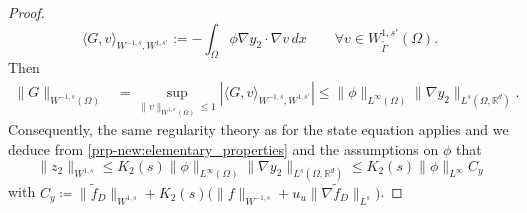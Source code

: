 \documentclass[10pt,a4paper]{amsart}
\newcommand{\R}{\mathbb{R}}
\begin{document}
\begin{proof}
\[
\langle G,v\rangle_{W^{-1,s},W^{1,s'}}
:=
-\int_\Omega \phi \nabla y_2\cdot \nabla v\,dx
\qquad
\forall v\in W^{1,s'}_{\tilde\Gamma}(\Omega).
\]
Then
\begin{align*}
\|G\|_{W^{-1,s}(\Omega)}
&=
\sup_{\|v\|_{W^{1,s'}(\Omega)}\le1}
\left|
\langle G,v\rangle_{W^{-1,s},W^{1,s'}}
\right|  \le
\|\phi\|_{L^\infty(\Omega)}
\|\nabla y_2\|_{L^s(\Omega,\mathbb R^d)} .
\end{align*}
Consequently, the same regularity theory as for the state equation
applies and we
deduce from \cref{prp-new:elementary_properties}
and the assumptions on $\phi$ that
%
\[ \|z_2\|_{W^{1,s}} \le  K_2(s) 
\|\phi\|_{L^\infty(\Omega)}\| \nabla y_2\|_{L^s(\Omega,\R^d)}
\le  K_2(s)\|\phi\|_{L^\infty}C_{y}
\]
%
with $C_y \coloneqq \|\tilde{f}_D\|_{W^{1,s}}
+ K_2(s)\bigl(\|f\|_{W^{-1,s}} 
+ u_u\|\nabla \tilde{f}_D\|_{L^s}\bigr)$.
\end{proof}
\end{document}
